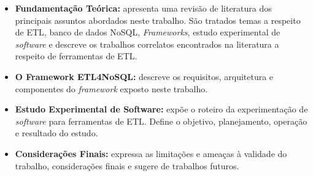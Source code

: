 \begin{itemize}
	\item \textbf{Fundamentação Teórica:} apresenta uma revisão de literatura dos principais assuntos abordados neste trabalho. São tratados temas a respeito de ETL, banco de dados NoSQL, \textit{Frameworks}, estudo experimental de \textit{software} e descreve os trabalhos correlatos encontrados na literatura a respeito de ferramentas de ETL.
	
	\item \textbf{O Framework ETL4NoSQL:} descreve os requisitos, arquitetura e componentes do \textit{framework} exposto neste trabalho.
	
	\item \textbf{Estudo Experimental de Software:} expõe o roteiro da experimentação de \textit{software} para ferramentas de ETL. Define o objetivo, planejamento, operação e resultado do estudo.
	
	\item \textbf{Considerações Finais:} expressa as limitações e ameaças à validade do trabalho, considerações finais e sugere de trabalhos futuros.	
	
\end{itemize}

